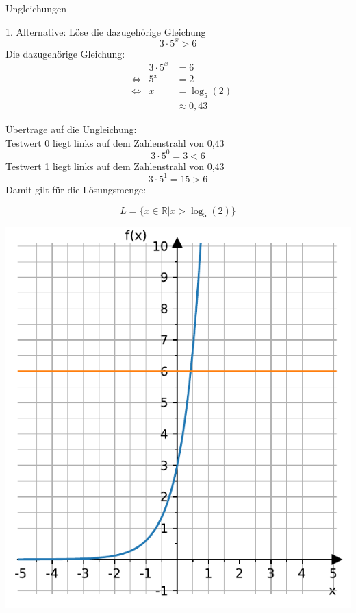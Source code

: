 \documentclass[
  ignorenonframetext,
  aspectratio=169,
]{beamer}
\begin{document}
\begin{frame}
\begin{block}{Ungleichungen}
\label{ungleichungen}
\begin{block}{1. Alternative: Löse die dazugehörige Gleichung}
\label{alternative-luxf6se-die-dazugehuxf6rige-gleichung}
\[
3\cdot 5^x > 6
\] Die dazugehörige Gleichung: \[
\begin{aligned}
& &3\cdot 5^x &= 6\\
&\Leftrightarrow &5^x &=2\\
&\Leftrightarrow &x &=\log_5(2)\\
&&&\approx 0,43
\end{aligned}
\]
\end{block}
\end{block}
\end{frame}

\begin{frame}
Übertrage auf die Ungleichung:\\
Testwert 0 liegt links auf dem Zahlenstrahl von 0,43 \[
3 \cdot 5^0 = 3 < 6
\] Testwert 1 liegt links auf dem Zahlenstrahl von 0,43 \[
3 \cdot 5^1 = 15 > 6
\] Damit gilt für die Lösungsmenge:

\[
L=\{x \in \mathbb{R}| x > \log_5(2)\}
\]
\end{frame}

\begin{frame}
\includegraphics{3_Gleichungen_files/figure-beamer/cell-9-output-1.pdf}
\end{frame}
\end{document}
